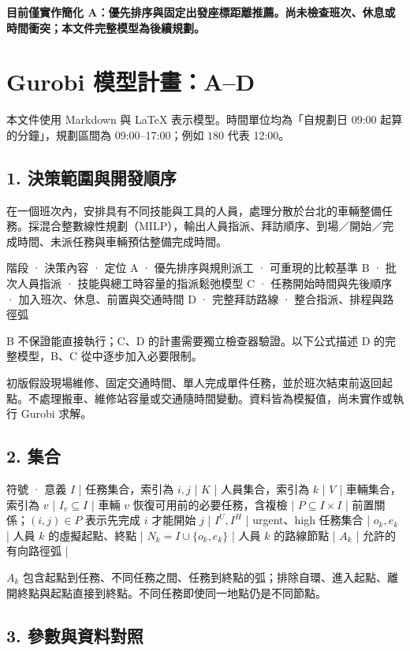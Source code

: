 \documentclass[UTF8,fontset=fandol]{ctexart}
\begin{document}
\textbf{目前僅實作簡化 A：優先排序與固定出發座標距離推薦。尚未檢查班次、休息或時間衝突；本文件完整模型為後續規劃。}

\section*{Gurobi 模型計畫：A–D}

本文件使用 Markdown 與 LaTeX 表示模型。時間單位均為「自規劃日 09:00 起算的分鐘」，規劃區間為 09:00–17:00；例如 $180$ 代表 12:00。

\subsection*{1. 決策範圍與開發順序}

在一個班次內，安排具有不同技能與工具的人員，處理分散於台北的車輛整備任務。採混合整數線性規劃（MILP），輸出人員指派、拜訪順序、到場／開始／完成時間、未派任務與車輛預估整備完成時間。

 階段  ·  決策內容  ·  定位 
 A  ·  優先排序與規則派工  ·  可重現的比較基準 
 B  ·  批次人員指派  ·  技能與總工時容量的指派鬆弛模型 
 C  ·  任務開始時間與先後順序  ·  加入班次、休息、前置與交通時間 
 D  ·  完整拜訪路線  ·  整合指派、排程與路徑弧 

B 不保證能直接執行；C、D 的計畫需要獨立檢查器驗證。以下公式描述 D 的完整模型，B、C 從中逐步加入必要限制。

初版假設現場維修、固定交通時間、單人完成單件任務，並於班次結束前返回起點。不處理搬車、維修站容量或交通隨時間變動。資料皆為模擬值，尚未實作或執行 Gurobi 求解。

\subsection*{2. 集合}

 符號  ·  意義 
 $I$ | 任務集合，索引為 $i,j$ |
 $K$ | 人員集合，索引為 $k$ |
 $V$ | 車輛集合，索引為 $v$ |
 $I_v\subseteq I$ | 車輛 $v$ 恢復可用前的必要任務，含複檢 |
 $P\subseteq I\times I$ | 前置關係；$(i,j)\in P$ 表示先完成 $i$ 才能開始 $j$ |
 $I^{U},I^{H}$ | urgent、high 任務集合 |
 $o_k,e_k$ | 人員 $k$ 的虛擬起點、終點 |
 $N_k=I\cup\{o_k,e_k\}$ | 人員 $k$ 的路線節點 |
 $A_k$ | 允許的有向路徑弧 |

$A_k$ 包含起點到任務、不同任務之間、任務到終點的弧；排除自環、進入起點、離開終點與起點直接到終點。不同任務即使同一地點仍是不同節點。

\subsection*{3. 參數與資料對照}
\end{document}
